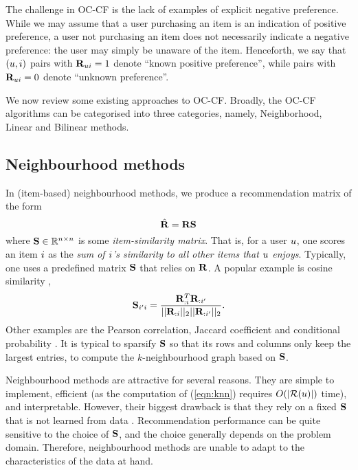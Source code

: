The challenge in OC-CF is the lack of examples of explicit negative preference.
While we may assume that a user purchasing an item is an indication of positive preference, a user not purchasing an item does not necessarily indicate a negative preference: the user may simply be unaware of the item.
Henceforth, we say that $(u, i)$ pairs with $\mathbf{R}_{ui} = 1$ denote ``known positive preference'', while pairs with $\mathbf{R}_{ui} = 0$ denote ``unknown preference''.

We now review some existing approaches to OC-CF. Broadly, the OC-CF algorithms can be categorised into three categories, namely, Neighborhood, Linear and Bilinear methods.

%
\subsection{Neighbourhood methods}
\label{sec:knn}

In (item-based) neighbourhood methods, we produce a recommendation matrix of the form
\begin{equation}
\label{eqn:knn}
\hat{\mathbf{R}} = \mathbf{R} \mathbf{S}
\end{equation}
where $\mathbf{S} \in \mathbb{R}^{n \times n}$ is some \emph{item-similarity matrix}.
That is, for a user $u$, one scores an item $i$ as the \emph{sum of $i$'s similarity to all other items that $u$ enjoys}.
Typically, one uses a predefined matrix $\mathbf{S}$ that relies on $\mathbf{R}$. A popular example is cosine similarity \citep{Sarwar:2001, Linden:2003},
$$ \mathbf{S}_{i' i} = \frac{ \mathbf{R}_{:i}^T \mathbf{R}_{:i'} }{|| \mathbf{R}_{:i} ||_2 || \mathbf{R}_{:i'} ||_2}. $$
Other examples are the Pearson correlation, Jaccard coefficient and conditional probability \citep{Deshpande:2004}. It is typical to sparsify $\mathbf{S}$ so that its rows and columns only keep the largest entries, \ie to compute the $k$-neighbourhood graph based on $\mathbf{S}$.

Neighbourhood methods are attractive for several reasons.
They are simple to implement, efficient (as the computation of (\ref{eqn:knn}) requires $O( | \mathcal{R}(u) | )$ time), and interpretable.
However, their biggest drawback is that they rely on a fixed $\mathbf{S}$ that is not learned from data \citep{Koren:2008b}.
Recommendation performance can be quite sensitive to the choice of $\mathbf{S}$, and the choice generally depends on the problem domain.
Therefore, neighbourhood methods are unable to adapt to the characteristics of the data at hand.

